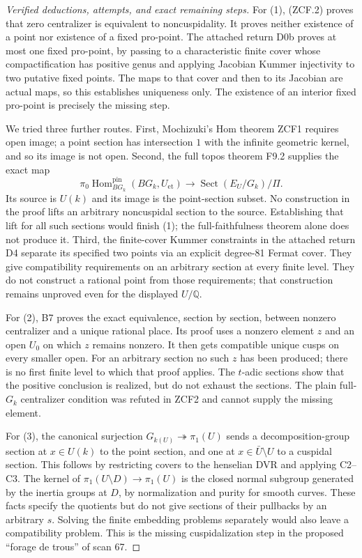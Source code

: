 \begin{proof}[Verified deductions, attempts, and exact remaining steps]
For (1), (ZCF.2) proves that zero centralizer is equivalent to
noncuspidality. It proves neither existence of a point nor
existence of a fixed pro-point. The attached return D0b proves
at most one fixed pro-point, by passing to a characteristic finite
cover whose compactification has positive genus and applying
Jacobian Kummer injectivity to two putative fixed points. The
maps to that cover and then to its Jacobian are actual maps, so
this establishes uniqueness only. The existence of an interior
fixed pro-point is precisely the missing step.

We tried three further routes. First, Mochizuki's Hom theorem
ZCF1 requires open image; a point section has intersection $1$
with the infinite geometric kernel, and so its image is not open.
Second, the full topos theorem F9.2 supplies the exact map
\[
 \pi_0\operatorname{Hom}^{\mathrm{pin}}_{B G_k}
       (B G_k,U_{\mathrm{et}})
       \longrightarrow \operatorname{Sect}(E_U/G_k)/\Pi.
\]
Its source is $U(k)$ and its image is the point-section subset.
No construction in the proof lifts an arbitrary noncuspidal
section to the source. Establishing that lift for all such sections
would finish (1); the full-faithfulness theorem alone does not
produce it. Third, the finite-cover Kummer constraints in the
attached return D4 separate its specified two points via an explicit
degree-81 Fermat cover. They give compatibility requirements on
an arbitrary section at every finite level. They do not construct
a rational point from those requirements; that construction remains
unproved even for the displayed $U/\mathbb Q$.

For (2), B7 proves the exact equivalence, section by section,
between nonzero centralizer and a unique rational place. Its proof
uses a nonzero element $z$ and an open $U_0$ on which $z$ remains
nonzero. It then gets compatible unique cusps on every smaller
open. For an arbitrary section no such $z$ has been produced;
there is no first finite level to which that proof applies.
The $t$-adic sections show that the positive conclusion is realized,
but do not exhaust the sections. The plain full-$G_k$ centralizer
condition was refuted in ZCF2 and cannot supply the missing element.

For (3), the canonical surjection
$G_{k(U)}\twoheadrightarrow\pi_1(U)$ sends a decomposition-group
section at $x\in U(k)$ to the point section, and one at
$x\in\bar U\setminus U$ to a cuspidal section. This follows by
restricting covers to the henselian DVR and applying C2--C3.
The kernel of $\pi_1(U\setminus D)\to\pi_1(U)$ is the closed
normal subgroup generated by the inertia groups at $D$, by
normalization and purity for smooth curves. These facts specify
the quotients but do not give sections of their pullbacks by an
arbitrary $s$. Solving the finite embedding problems separately
would also leave a compatibility problem. This is the missing
cuspidalization step in the proposed ``forage de trous'' of scan 67.


\end{proof}

